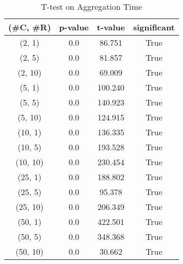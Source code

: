 \begin{table}[h]
\centering
\caption{T-test on Aggregation Time}
\label{tab:t-testAggregating}
\begin{tabular}{|c|c|c|c|}
\toprule
(\#C, \#R) &  p-value &  t-value &  significant \\
\midrule
  (2, 1) &      0.0 &   86.751 &         True \\
  (2, 5) &      0.0 &   81.857 &         True \\
 (2, 10) &      0.0 &   69.009 &         True \\
  (5, 1) &      0.0 &  100.240 &         True \\
  (5, 5) &      0.0 &  140.923 &         True \\
 (5, 10) &      0.0 &  124.915 &         True \\
 (10, 1) &      0.0 &  136.335 &         True \\
 (10, 5) &      0.0 &  193.528 &         True \\
(10, 10) &      0.0 &  230.454 &         True \\
 (25, 1) &      0.0 &  188.802 &         True \\
 (25, 5) &      0.0 &   95.378 &         True \\
(25, 10) &      0.0 &  206.349 &         True \\
 (50, 1) &      0.0 &  422.501 &         True \\
 (50, 5) &      0.0 &  348.368 &         True \\
(50, 10) &      0.0 &   30.662 &         True \\
\bottomrule
\end{tabular}
\end{table}
